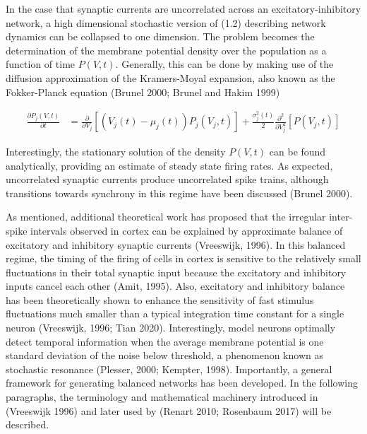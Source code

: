 \documentclass{ucetd}
\begin{document}
In the case that synaptic currents are uncorrelated across an excitatory-inhibitory network, a high dimensional stochastic version of (1.2) describing network dynamics can be collapsed to one dimension. The problem becomes the determination of the membrane potential density over the population as a function of time $P(V,t)$. Generally, this can be done by making use of the diffusion approximation of the Kramers-Moyal expansion, also known as the Fokker-Planck equation (Brunel 2000; Brunel and Hakim 1999)


\begin{align}
\frac{\partial P_{j}(V,t)}{\partial t} &= \frac{\partial}{\partial V_{j}}[\left(V_{j}(t)-\mu_{j}(t)\right) P_{j}(V_{j},t)] + \frac{\sigma_{j}^{2}(t)}{2}\frac{\partial^{2}}{\partial V_{j}^{2}}[P(V_{j},t)]
\end{align}


Interestingly, the stationary solution of the density $P(V,t)$ can be found analytically, providing an estimate of steady state firing rates. As expected, uncorrelated synaptic currents produce uncorrelated spike trains, although transitions towards synchrony in this regime have been discussed (Brunel 2000). 

As mentioned, additional theoretical work has proposed that the irregular inter-spike intervals observed in cortex can be explained by approximate balance of excitatory and inhibitory synaptic currents (Vreeswijk, 1996). In this balanced regime, the timing of the firing of cells in cortex is sensitive to the relatively small fluctuations in their total synaptic input because the excitatory and inhibitory inputs cancel each other (Amit, 1995). Also, excitatory and inhibitory balance has been theoretically shown to enhance the sensitivity of fast stimulus fluctuations much smaller than a typical integration time constant for a single neuron (Vreeswijk, 1996; Tian 2020). Interestingly, model neurons optimally detect temporal information when the average membrane potential is one standard deviation of the noise below threshold, a phenomenon known as stochastic resonance (Plesser, 2000; Kempter, 1998). Importantly, a general framework for generating balanced networks has been developed. In the following paragraphs, the terminology and mathematical machinery introduced in (Vreeswijk 1996) and later used by (Renart 2010; Rosenbaum 2017) will be described.
\end{document}

